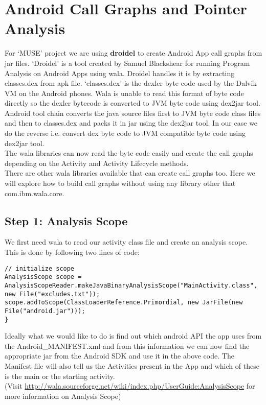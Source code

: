 \documentclass[11pt,psfig,a4]{article}
\begin{document}
\section{Android Call Graphs and Pointer Analysis}
\begin{flushleft}
For `MUSE' project we are using \textbf{droidel} to create Android App call graphs from jar files. `Droidel' is a tool created by Samuel Blackshear for running Program Analysis on Android Apps using wala. Droidel handles it is by extracting classes.dex from apk file. `classes.dex' is the dexler byte code used by the Dalvik VM on the Android phones. Wala is unable to read this format of byte code directly so the dexler bytecode is converted to JVM byte code using dex2jar tool. Android tool chain converts the java source files first to JVM byte code class files and then to classes.dex and packs it in jar using the dex2jar tool. In our case we do the reverse i.e. convert dex byte code to JVM compatible byte code using dex2jar tool.\\
\vspace{0.5em}
The wala libraries can now read the byte code easily and create the call graphs depending on the Activity and Activity Lifecycle methods.\\
\vspace{0.5em}
There are other wala libraries available that can create call graphs too. Here we will explore how to build call graphs without using any library other that com.ibm.wala.core.\\
\subsection{Step 1: Analysis Scope}
We first need wala to read our activity class file and create an analysis scope. This is done by following two lines of code: \\
\begin{lstlisting}
// initialize scope
AnalysisScope scope = AnalysisScopeReader.makeJavaBinaryAnalysisScope("MainActivity.class", new File("excludes.txt"));
scope.addToScope(ClassLoaderReference.Primordial, new JarFile(new File("android.jar")));
}
\end{lstlisting}
Ideally what we would like to do is find out which android API the app uses from the Android\_MANIFEST.xml and from this information we can now find the appropriate jar from the Android SDK and use it in the above code. The Manifest file will also tell us the Activities present in the App and which of these is the main or the starting activity.\\
\vspace{0.5em}
(Visit \url{http://wala.sourceforge.net/wiki/index.php/UserGuide:AnalysisScope} for more information on Analysis Scope)\\

\end{flushleft}
\end{document}
